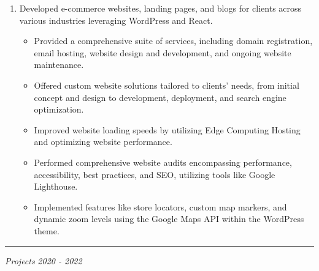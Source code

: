 \documentclass{article}
\begin{document}
\begin{enumerate}
    \item[] Developed e-commerce websites, landing pages, and blogs for clients across various industries leveraging WordPress and React.
   \begin{itemize}
    \item Provided a comprehensive suite of services, including domain registration, email hosting, website design and development, and ongoing website maintenance.
    \item Offered custom website solutions tailored to clients' needs, from initial concept and design to development, deployment, and search engine optimization.
    \item Improved website loading speeds  by utilizing Edge Computing Hosting and optimizing website performance.
    \item Performed comprehensive website audits encompassing performance, accessibility, best practices, and SEO, utilizing tools like Google Lighthouse.
    \item Implemented features like store locators, custom map markers, and dynamic zoom levels using the Google Maps API within the WordPress theme.
   \end{itemize}
\end{enumerate}



\vspace{1.4em}
\hrule 
\vspace{0.4em}
\hspace{-2.em}
{\em Projects } \hfill {\em 2020 - 2022 } %
\end{document}
